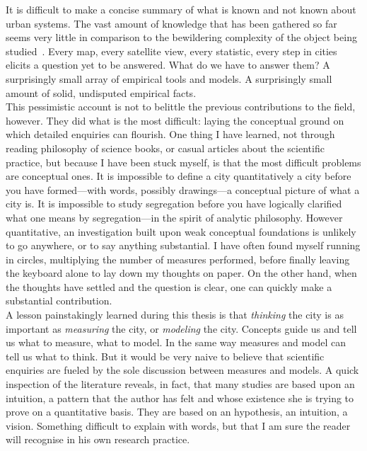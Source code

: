 It is difficult to make a concise summary of what is known and not known about
urban systems. The vast amount of knowledge that has been gathered so far seems
very little in comparison to the bewildering complexity of the object being
studied~\cite{Batty:2008}. Every map, every satellite view, every statistic, every step
in cities elicits a question yet to be answered. What do we have to answer them?
A surprisingly small array of empirical tools and models. A surprisingly small
amount of solid, undisputed empirical facts.\\

This pessimistic account is not to belittle the previous contributions to the
field, however. They did what is the most difficult: laying the conceptual
ground on which detailed enquiries can flourish. One thing I have learned, not
through reading philosophy of science books, or casual articles about the
scientific practice, but because I have been stuck myself, is that the most
difficult problems are conceptual ones. It is impossible to define a city
quantitatively a city before you have formed---with words, possibly drawings---a
conceptual picture of what a city is. It is impossible to study segregation
before you have logically clarified what one means by segregation---in the
spirit of analytic philosophy. However quantitative, an investigation built upon
weak conceptual foundations is unlikely to go anywhere, or to say anything
substantial. I have often found myself running in circles, multiplying the
number of measures performed, before finally leaving the keyboard alone to lay
down my thoughts on paper. On the other hand, when the thoughts have settled and
the question is clear, one can quickly make a substantial contribution.\\

A lesson painstakingly learned during this thesis is that \emph{thinking} the
city is as important as \emph{measuring} the city, or \emph{modeling} the city.
Concepts guide us and tell us what to measure, what to model. In the same way
measures and model can tell us what to think. But it would be very naive to
believe that scientific enquiries are fueled by the sole discussion between
measures and models. A quick inspection of the literature reveals, in fact, that
many studies are based upon an intuition, a pattern that the author has felt and
whose existence she is trying to prove on a quantitative basis. They are based
on an hypothesis, an intuition, a vision. Something difficult to explain with
words, but that I am sure the reader will recognise in his own research
practice.
